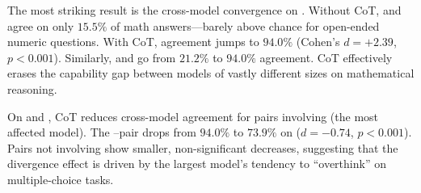 \begin{table}[t]
\centering
\caption{Cross-model pairwise agreement under direct and CoT prompting. Agreement is computed over all $5 \times 5 = 25$ sample pairs per question, averaged across 30 questions. Significant differences marked with *.}
\label{tab:cross}
\end{table}

 The most striking result is the cross-model convergence on \gsm. Without CoT, \gptmini and \gptnano agree on only $15.5\%$ of math answers---barely above chance for open-ended numeric questions. With CoT, agreement jumps to $94.0\%$ (Cohen's $d = +2.39$, $p < 0.001$). Similarly, \gptlarge and \gptnano go from $21.2\%$ to $94.0\%$ agreement. CoT effectively erases the capability gap between models of vastly different sizes on mathematical reasoning.

 On \csqa and \arc, CoT reduces cross-model agreement for pairs involving \gptlarge (the most affected model). The \gptlarge--\gptmini pair drops from $94.0\%$ to $73.9\%$ on \csqa ($d = -0.74$, $p < 0.001$). Pairs not involving \gptlarge show smaller, non-significant decreases, suggesting that the divergence effect is driven by the largest model's tendency to ``overthink'' on multiple-choice tasks.

